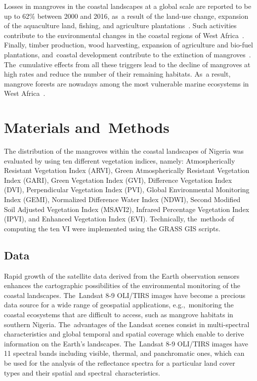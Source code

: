 \documentclass[jmse,article,accept,pdftex,moreauthors]{Definitions/mdpi}
\begin{document}
Losses in mangroves in the coastal landscapes at a global scale are reported to be up to 62\% between 2000 and 2016, as~a result of the land-use change, expansion of the aquaculture land, fishing, and agriculture plantations~\cite{Goldberg}. Such activities contribute to the environmental changes in the coastal regions of West Africa~\cite{land11111982,su12187349,Babanyara}. Finally, timber production, wood harvesting, expansion of agriculture and bio-fuel plantations, and~coastal development contribute to the extinction of mangroves~\cite{Feka}. The~cumulative effects from all these triggers lead to the decline of mangroves at high rates and reduce the number of their remaining habitats. As~a result, mangrove forests are nowadays among the most vulnerable marine ecosystems in West Africa~\cite{ORIJEMIE2012360}. 

\section{Materials and~Methods}

The distribution of the mangroves within the coastal landscapes of Nigeria was evaluated by using ten different vegetation indices, namely: Atmospherically Resistant Vegetation Index (ARVI), Green Atmospherically Resistant Vegetation Index (GARI), Green Vegetation Index (GVI), Difference Vegetation Index (DVI), Perpendicular Vegetation Index (PVI), Global Environmental Monitoring Index (GEMI), Normalized Difference Water Index (NDWI), Second Modified Soil Adjusted Vegetation Index (MSAVI2), Infrared Percentage Vegetation Index (IPVI), and Enhanced Vegetation Index (EVI). Technically, the~methods of computing the ten VI were implemented using the GRASS GIS scripts. 

\subsection{Data}
Rapid growth of the satellite data derived from the Earth observation sensors enhances the cartographic possibilities of the environmental monitoring of the coastal landscapes. The~Landsat 8-9 OLI/TIRS images have become a precious data source for a wide range of geospatial applications, e.g.,~monitoring the coastal ecosystems that are difficult to access, such as mangrove habitats in southern Nigeria. The~advantages of the Landsat scenes consist in multi-spectral characteristics and global temporal and spatial coverage which enable to derive information on the Earth's landscapes. The~Landsat 8-9 OLI/TIRS images have 11 spectral bands including visible, thermal, and panchromatic ones, which can be used for the analysis of the reflectance spectra for a particular land cover types and their spatial and spectral~characteristics.
\end{document}
